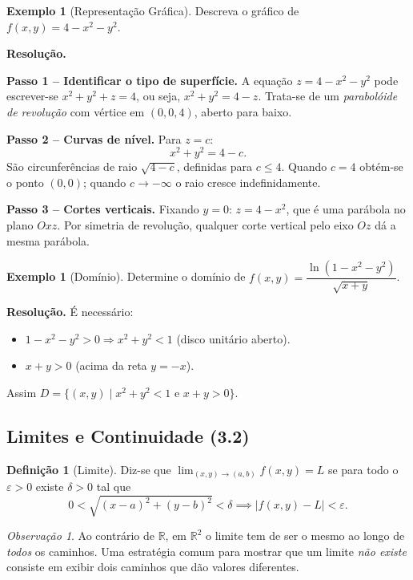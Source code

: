 \documentclass[12pt,a4paper]{article}
\theoremstyle{definition}
\newtheorem{definition}[theorem]{Definição}
\newtheorem{example}[theorem]{Exemplo}
\theoremstyle{remark}
\newtheorem{remark}[theorem]{Observação}
\begin{document}
\begin{example}[Representação Gráfica]
  Descreva o gráfico de $f(x,y)=4-x^2-y^2$.
 
  \textbf{Resolução.}
 
  \textbf{Passo 1 -- Identificar o tipo de superfície.} A equação
  $z=4-x^2-y^2$ pode escrever-se $x^2+y^2+z=4$, ou seja,
  $x^2+y^2=4-z$. Trata-se de um \emph{parabolóide de revolução} com
  vértice em $(0,0,4)$, aberto para baixo.
 
  \textbf{Passo 2 -- Curvas de nível.} Para $z=c$:
  \[
    x^2+y^2 = 4-c.
  \]
  São circunferências de raio $\sqrt{4-c}$, definidas para $c\leq 4$.
  Quando $c=4$ obtém-se o ponto $(0,0)$; quando $c\to-\infty$ o raio
  cresce indefinidamente.
 
  \textbf{Passo 3 -- Cortes verticais.} Fixando $y=0$:
  $z=4-x^2$, que é uma parábola no plano $Oxz$. Por simetria de
  revolução, qualquer corte vertical pelo eixo $Oz$ dá a mesma parábola.
\end{example}
 
\begin{example}[Domínio]
  Determine o domínio de $f(x,y)=\dfrac{\ln(1-x^2-y^2)}{\sqrt{x+y}}$.
 
  \textbf{Resolução.} É necessário:
  \begin{itemize}[nosep]
    \item $1-x^2-y^2>0 \Rightarrow x^2+y^2 < 1$ (disco unitário aberto).
    \item $x+y>0$ (acima da reta $y=-x$).
  \end{itemize}
  Assim $D = \{(x,y)\mid x^2+y^2<1 \text{ e } x+y>0\}$.
\end{example}

\subsection{Limites e Continuidade (3.2)}

\begin{definition}[Limite]
  Diz-se que $\displaystyle\lim_{(x,y)\to(a,b)}f(x,y) = L$ se para todo o
  $\varepsilon>0$ existe $\delta>0$ tal que
  \[
    0 < \sqrt{(x-a)^2+(y-b)^2} < \delta \implies |f(x,y)-L|<\varepsilon.
  \]
\end{definition}

\begin{remark}
  Ao contrário de $\mathbb{R}$, em $\mathbb{R}^2$ o limite tem de ser o mesmo
  ao longo de \emph{todos} os caminhos. Uma estratégia comum para mostrar que
  um limite \emph{não existe} consiste em exibir dois caminhos que dão valores
  diferentes.
\end{remark}
\end{document}
